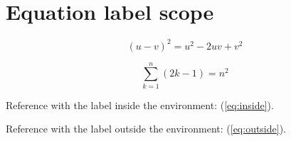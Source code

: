 \documentclass[a4paper,12pt]{article}
\begin{document}
\setcounter{section}{6}
\setcounter{equation}{3}

\section{Equation label scope}

\begin{equation}
    (u-v)^{2}=u^{2}-2uv+v^{2}
    \label{eq:inside}
\end{equation}

\begin{equation}
    \sum_{k=1}^{n}(2k-1)=n^{2}
\end{equation}
\label{eq:outside}

Reference with the label inside the environment:
(\ref{eq:inside}).

Reference with the label outside the environment:
(\ref{eq:outside}).
\end{document}
